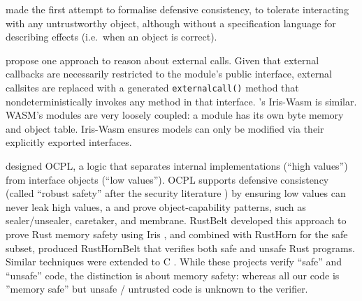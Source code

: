 \citet{Murray10dphil} made the first attempt to formalise defensive
consistency, %
to tolerate interacting with any untrustworthy object,
although without a specification language for describing effects
(i.e.\ when an object is correct).

 \citet{CassezFQ24} propose one approach to reason about external calls.
Given that external callbacks are necessarily restricted to the module's public interface,
external callsites are replaced  with a
generated \texttt{externalcall()} method that  nondeterministically invokes any method in that interface.
\citet{iris-wasm-pldi2023}'s Iris-Wasm is similar.
WASM's
modules are very loosely coupled: a module
has its own byte memory
and object table.
Iris-Wasm ensures models 
can only be
modified via their explicitly exported interfaces. 
 
 

\citet{ddd}  designed OCPL, a logic
that separates internal implementations (``high values'')
from interface objects
(``low values''). %
OCPL supports defensive
consistency %
(called ``robust safety'' after the
security literature \cite{Bengtson})
by ensuring
low values can never leak high values, a %
and 
prove %
object-capability patterns, such as
sealer/unsealer, caretaker, and membrane.
%
%
RustBelt \cite{RustBelt18}
developed this approach to prove Rust memory safety using Iris \cite{iris-jfp2018},
and combined with RustHorn \cite{RustHorn-toplas2021} for the safe subset,
produced RustHornBelt \cite{RustHornBelt-pldi2022} that verifies
both safe and unsafe Rust programs. %
Similar techniques were extended to C \cite{RefinedC-pldi2021}.
While these projects 
verify ``safe'' and ``unsafe'' code, 
%
the distinction is about memory safety:%
%
%
%
whereas all our code is ''memory safe''
but unsafe / untrusted code is unknown to the verifier.


